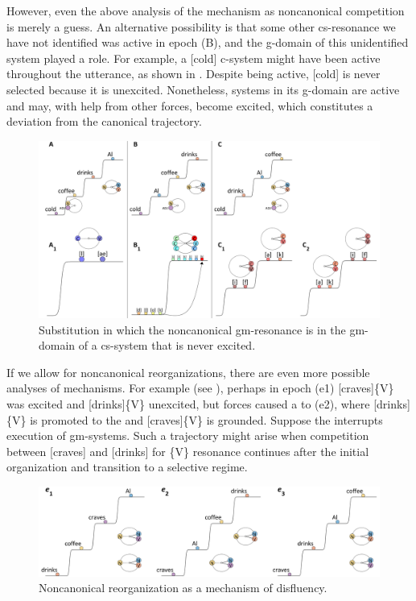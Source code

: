   However, even the above analysis of the  mechanism as noncanonical competition is merely a guess. An alternative possibility is that some other cs-resonance we have not identified was active in epoch (B), and the g-domain of this unidentified system played a role. For example, a [cold] c-system might have been active throughout the utterance, as shown in {}. Despite being active, [cold] is never selected because it is unexcited. Nonetheless, systems in its g-domain are active and may, with help from other forces, become excited, which constitutes a deviation from the canonical trajectory.

  
\begin{figure}
\includegraphics[width=\textwidth]{figures/Tilsen-img59.png}
\caption{Substitution in which the noncanonical gm-resonance is in the gm-domain of a cs-system that is never excited.}
\label{fig:4:9}
\end{figure}
 

  If we allow for noncanonical reorganizations, there are even more possible analyses of  mechanisms. For example (see {}), perhaps in epoch (e1) [craves]\{V\} was excited and [drinks]\{V\} unexcited, but  forces caused a  to (e2), where [drinks]\{V\} is promoted to the  and [craves]\{V\} is grounded. Suppose the  interrupts execution of gm-systems. Such a trajectory might arise when competition between [craves] and [drinks] for \{V\} resonance continues after the initial organization and transition to a selective regime. 

  
\begin{figure}
\includegraphics[width=\textwidth]{figures/Tilsen-img60.png}
\caption{Noncanonical reorganization as a mechanism of disfluency.}
\label{fig:4:10}
\end{figure}
 

